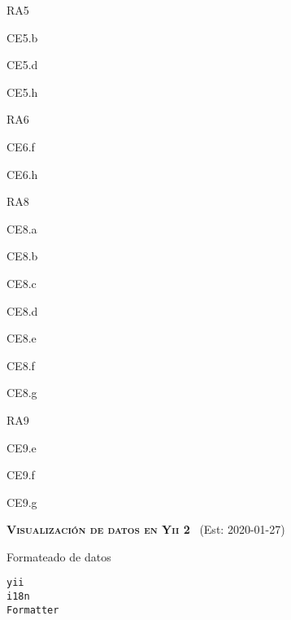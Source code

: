 \begin{longenum}
\begin{longenum}
\begin{longenum}
\begin{longenum}
\begin{longenum}
                \end{longenum}
                \item RA5
                \begin{longenum}
                    \item CE5.b
                    \item CE5.d
                    \item CE5.h
                \end{longenum}
                \item RA6
                \begin{longenum}
                    \item CE6.f
                    \item CE6.h
                \end{longenum}
                \item RA8
                \begin{longenum}
                    \item CE8.a
                    \item CE8.b
                    \item CE8.c
                    \item CE8.d
                    \item CE8.e
                    \item CE8.f
                    \item CE8.g
                \end{longenum}
                \item RA9
                \begin{longenum}
                    \item CE9.e
                    \item CE9.f
                    \item CE9.g
                \end{longenum}
            \end{longenum}
        \end{longenum}
    \end{longenum}
    \item \textbf{\textsc{Visualización de datos en Yii 2}} \ (Est: 2020-01-27)
    \begin{longenum}
        \item Formateado de datos
        \begin{longenum}
            \item \texttt{yii\\i18n\\Formatter}

\end{longenum}
\end{longenum}
\end{longenum}
